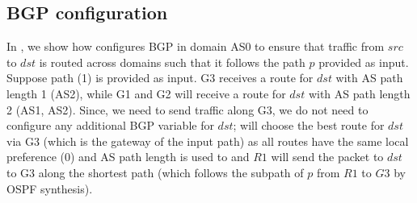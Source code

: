 \begin{figure}
	\centering
\end{figure}

\subsection{BGP configuration}
In , we show how \name configures BGP in domain AS0 
to ensure that traffic from $src$ to $dst$ is routed across domains 
such that it follows the path $p$ provided as input. Suppose path (1) is
provided as input. G3 receives a route for $dst$ with AS path length 1
(AS2), while G1 and G2 will receive a route for $dst$ with 
AS path length 2 (AS1, AS2). Since, we need to send traffic along
G3, we do not need to configure any additional BGP variable for $dst$;
 will choose the best route for $dst$ 
via G3 (which is the gateway of the input path) as all routes have
the same local preference (0) and AS path length is used to  and $R1$ will
send the packet to $dst$ to G3 along the shortest path (which 
follows the subpath of $p$ from $R1$ to $G3$ by OSPF synthesis). 


